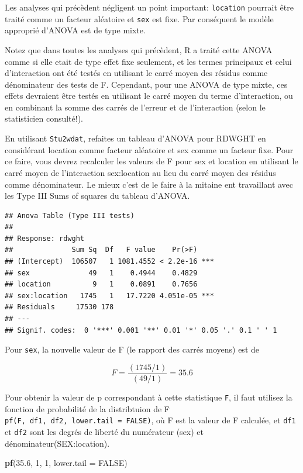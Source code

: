 \documentclass[12pt,]{book}
\newenvironment{Shaded}{\begin{snugshade}}{\end{snugshade}}
\newcommand{\DataTypeTok}[1]{\textcolor[rgb]{0.13,0.29,0.53}{#1}}
\newcommand{\DecValTok}[1]{\textcolor[rgb]{0.00,0.00,0.81}{#1}}
\newcommand{\FloatTok}[1]{\textcolor[rgb]{0.00,0.00,0.81}{#1}}
\newcommand{\KeywordTok}[1]{\textcolor[rgb]{0.13,0.29,0.53}{\textbf{#1}}}
\newcommand{\NormalTok}[1]{#1}
\newcommand{\OtherTok}[1]{\textcolor[rgb]{0.56,0.35,0.01}{#1}}
\begin{document}
Les analyses qui précèdent négligent un point important: \texttt{location} pourrait être traité comme un facteur aléatoire et \texttt{sex} est fixe. Par conséquent le modèle approprié d'ANOVA est de type mixte.

Notez que dans toutes les analyses qui précèdent, R a traité cette ANOVA comme si elle etait de type effet fixe seulement, et les termes principaux et celui d'interaction ont été testés en utilisant le carré moyen des résidus comme dénominateur des tests de F. Cependant, pour une ANOVA de type mixte, ces effets devraient être testés en utilisant le carré moyen du terme d'interaction, ou en combinant la somme des carrés de l'erreur et de l'interaction (selon le statisticien consulté!).

En utilisant \texttt{Stu2wdat}, refaites un tableau d'ANOVA pour RDWGHT en considérant location comme facteur aléatoire et sex comme un facteur fixe. Pour ce faire, vous devrez recalculer les valeurs de F pour sex et location en utilisant le carré moyen de l'interaction sex:location au lieu du carré moyen des résidus comme dénominateur. Le mieux c'est de le faire à la mitaine ent travaillant avec les Type III Sums of squares du tableau d'ANOVA.

\begin{verbatim}
## Anova Table (Type III tests)
## 
## Response: rdwght
##              Sum Sq  Df   F value    Pr(>F)    
## (Intercept)  106507   1 1081.4552 < 2.2e-16 ***
## sex              49   1    0.4944    0.4829    
## location          9   1    0.0891    0.7656    
## sex:location   1745   1   17.7220 4.051e-05 ***
## Residuals     17530 178                        
## ---
## Signif. codes:  0 '***' 0.001 '**' 0.01 '*' 0.05 '.' 0.1 ' ' 1
\end{verbatim}

Pour \texttt{sex}, la nouvelle valeur de F (le rapport des carrés moyens) est de

\[F = \frac{(1745/1)}{(49/1)} = 35.6\]

Pour obtenir la valeur de p correspondant à cette statistique \texttt{F}, il faut utilisez la fonction de probabilité de la distribtuion de F \texttt{pf(F,\ df1,\ df2,\ lower.tail\ =\ FALSE)}, où F est la valeur de F calculée, et \texttt{df1} et \texttt{df2} sont les degrés de liberté du numérateur (sex) et dénominateur(SEX:location).

\begin{Shaded}
\begin{Highlighting}[]
\KeywordTok{pf}\NormalTok{(}\FloatTok{35.6}\NormalTok{, }\DecValTok{1}\NormalTok{, }\DecValTok{1}\NormalTok{, }\DataTypeTok{lower.tail =}  \OtherTok{FALSE}\NormalTok{)}
\end{Highlighting}
\end{Shaded}
\end{document}

